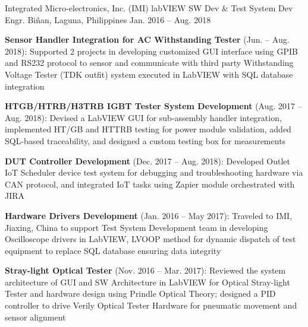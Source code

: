 \begin{cventries}
  \cventry
    {Integrated Micro-electronics, Inc. (IMI)}
    {labVIEW SW Dev \& Test System Dev Engr.}
    {Biñan, Laguna, Philippines}
    {Jan. 2016 -- Aug. 2018}
    {
      \begin{cvitems}
        \item{\textbf{Sensor Handler Integration for AC Withstanding Tester} (Jun. -- Aug. 2018): Supported 2 projects in developing customized GUI interface using GPIB and RS232 protocol to sensor and communicate with third party Withstanding Voltage Tester (TDK outfit) system executed in LabVIEW with SQL database integration}
        \item{\textbf{HTGB/HTRB/H3TRB IGBT Tester System Development} (Aug. 2017 -- Aug. 2018): Devised a LabVIEW GUI for sub-assembly handler integration, implemented HT/GB and HTTRB testing for power module validation, added SQL-based traceability, and designed a custom testing box for measurements}
        \item{\textbf{DUT Controller Development} (Dec. 2017 -- Aug. 2018): Developed Outlet IoT Scheduler device test system for debugging and troubleshooting hardware via CAN protocol, and integrated IoT tasks using Zapier module orchestrated with JIRA}
        \item{\textbf{Hardware Drivers Development} (Jan. 2016 -- May 2017): Traveled to IMI, Jiaxing, China to support Test System Development team in developing Oscilloscope drivers in LabVIEW, LVOOP method for dynamic dispatch of test equipment to replace SQL database ensuring data integrity}
        \item{\textbf{Stray-light Optical Tester} (Nov. 2016 -- Mar. 2017): Reviewed the system architecture of GUI and SW Architecture in LabVIEW for Optical Stray-light Tester and hardware design using Prindle Optical Theory; designed a PID controller to drive Verily Optical Tester Hardware for pneumatic movement and sensor alignment}
      \end{cvitems}
      \vspace{1em}
    }

\end{cventries}
